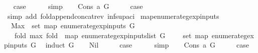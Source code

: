 \begin{isabellebody}
\ \isamarkupfalse%
\ {\isacharquery}case\isanewline
\ \ \ \ \isamarkupfalse%
\ simp\isanewline
{}\isamarkupfalse%
\isanewline
\ \ \isamarkupfalse%
\ {\isacharparenleft}Cons\ a\ G{\isacharparenright}\isanewline
\ \ \isamarkupfalse%
\ \isamarkupfalse%
\ {\isacharquery}case\isanewline
\ \ \ \ \isamarkupfalse%
\ {\isacharparenleft}simp\ add{\isacharcolon}\ fold{\isacharunderscore}append{\isacharunderscore}concat{\isacharunderscore}rev\ inf{\isacharunderscore}sup{\isacharunderscore}aci{\isacharparenleft}{}{\isacharparenright}{\isacharparenright}\isanewline
{}\isamarkupfalse%
%
\endisatagproof
{\isafoldproof}%
%
\isadelimproof
\isanewline
%
\endisadelimproof
\isanewline
{}\isamarkupfalse%
\ map{\isacharunderscore}enumerate{\isacharunderscore}gexp{\isacharunderscore}inputs{\isacharcolon}\ \isanewline
\ \ {\isachardoublequoteopen}{\isacharparenleft}Max\ {\isacharparenleft}{\isasymUnion}\ {\isacharparenleft}set\ {\isacharparenleft}map\ enumerate{\isacharunderscore}gexp{\isacharunderscore}inputs\ G{\isacharparenright}{\isacharparenright}{\isacharparenright}\ {\isacharequal}\isanewline
\ \ \ {\isacharparenleft}fold\ {\isacharparenleft}max{\isacharparenright}\ {\isacharparenleft}fold\ {\isacharparenleft}{\isacharat}{\isacharparenright}\ {\isacharparenleft}map\ enumerate{\isacharunderscore}gexp{\isacharunderscore}inputs{\isacharunderscore}list\ G{\isacharparenright}\ {\isacharbrackleft}{\isacharbrackright}{\isacharparenright}\ {}{\isacharparenright}{\isacharparenright}\ {\isasymor}\ {\isacharparenleft}{\isacharparenleft}{\isasymUnion}\ {\isacharparenleft}set\ {\isacharparenleft}map\ enumerate{\isacharunderscore}gexp{\isacharunderscore}inputs\ G{\isacharparenright}{\isacharparenright}\ {\isacharequal}\ {\isacharbraceleft}{\isacharbraceright}{\isacharparenright}{\isacharparenright}{\isachardoublequoteclose}\isanewline
%
\isadelimproof
%
\endisadelimproof
%
\isatagproof
{}\isamarkupfalse%
{\isacharparenleft}induct\ G{\isacharparenright}\isanewline
\ \ \isamarkupfalse%
\ Nil\isanewline
\ \ \isamarkupfalse%
\ \isamarkupfalse%
\ {\isacharquery}case\isanewline
\ \ \ \ \isamarkupfalse%
\ simp\isanewline
{}\isamarkupfalse%
\isanewline
\ \ \isamarkupfalse%
\ {\isacharparenleft}Cons\ a\ G{\isacharparenright}\isanewline
\ \ \isamarkupfalse%
\ \isamarkupfalse%
\ {\isacharquery}case\isanewline

\end{isabellebody}

